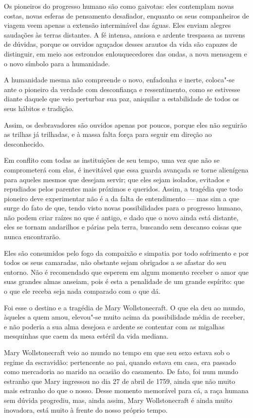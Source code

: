 Os pioneiros do progresso humano são como gaivotas: eles contemplam
novas costas, novas esferas de pensamento desafiador, enquanto os seus
companheiros de viagem veem apenas a extensão interminável das águas.
Eles enviam alegres saudações às terras distantes. A fé intensa, ansiosa
e ardente trespassa as nuvens de dúvidas, porque os ouvidos aguçados
desses arautos da vida são capazes de distinguir, em meio aos estrondos
enlouquecedores das ondas, a nova mensagem e o novo símbolo para a
humanidade.

A humanidade mesma não compreende o novo, enfadonha e inerte, coloca"-se
ante o pioneiro da verdade com desconfiança e ressentimento, como se
estivesse diante daquele que veio perturbar sua paz, aniquilar a
estabilidade de todos os seus hábitos e tradição.

Assim, os desbravadores são ouvidos apenas por poucos, porque eles não
seguirão as trilhas já trilhadas, e à massa falta força para seguir
em direção ao desconhecido.

Em conflito com todas as instituições de seu tempo, uma vez que não se
comprometerá com elas, é inevitável que essa guarda avançada se torne
alienígena para aqueles mesmos que desejam servir; que eles sejam
isolados, evitados e repudiados pelos parentes mais próximos e queridos.
Assim, a tragédia que todo pioneiro deve experimentar não é a da falta
de entendimento --- mas sim a que surge do fato de que, tendo visto novas
possibilidades para o progresso humano, não podem criar
raízes no que é antigo, e dado que o novo ainda está distante, eles se
tornam andarilhos e párias pela terra, buscando sem descanso coisas
que nunca encontrarão.

Eles são consumidos pelo fogo da compaixão e simpatia por todo
sofrimento e por todos os seus camaradas, não obstante sejam obrigados a
se afastar do seu entorno. Não é recomendado que esperem em algum
momento receber o amor que suas grandes almas anseiam, pois é esta a
penalidade de um grande espírito: que o que ele receba seja nada
comparado com o que dá.

Foi esse o destino e a tragédia de Mary Wollstonecraft. O que ela deu ao
mundo, àqueles a quem amou, elevou"-se muito acima da possibilidade média
de receber, e não poderia a sua alma desejosa e ardente se contentar com
as migalhas mesquinhas que caem da mesa estéril da vida mediana.

Mary Wollstonecraft veio ao mundo no tempo em que seu sexo estava sob o
regime da escravidão: pertencente ao pai, quando estava em casa, era
passado como mercadoria ao marido na ocasião do casamento. De fato, foi
num mundo estranho que Mary ingressou no dia 27 de abril de
1759, ainda que não muito mais estranho do que o nosso. Desse momento
memorável para cá, a raça humana sem dúvida progrediu, mas, ainda assim,
Mary Wollstonecraft é ainda muito inovadora, está muito à frente do
nosso próprio tempo.

